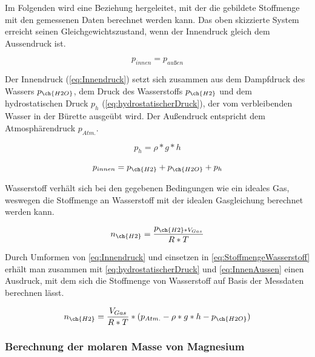 \documentclass{article}
\begin{document}
      Im Folgenden wird eine Beziehung hergeleitet, mit der die gebildete Stoffmenge mit den gemessenen Daten berechnet werden kann. 
      Das oben skizzierte System erreicht seinen Gleichgewichtszustand, wenn der Innendruck gleich dem Aussendruck ist.
    
      \begin{equation}
        p_{innen} = p_{außen} \label{eq:InnenAussen}
      \end{equation}
    
      Der Innendruck (\ref{eq:Innendruck}) setzt sich zusammen aus dem Dampfdruck des Wassers \textit{$ p_{\ch{H2O}}$}, dem Druck des Wasserstoffs \textit{$ p_{\ch{H2}}$} und dem hydrostatischen Druck \textit{$ p_{h}$} (\ref{eq:hydrostatischerDruck}), der vom  verbleibenden Wasser in der Bürette ausgeübt wird. Der Außendruck entspricht dem Atmosphärendruck \textit{$ p_{Atm.}$}.
    
      \begin{equation} 
        p_{h} = \rho * g * h \label{eq:hydrostatischerDruck}
      \end{equation} 
    
      \begin{equation}
        p_{innen} = p_{\ch{H2}} + p_{\ch{H2O}} + p_{h} \label{eq:Innendruck}
      \end{equation}
    
      Wasserstoff verhält sich bei den gegebenen Bedingungen wie ein ideales Gas, weswegen die Stoffmenge an Wasserstoff mit der idealen Gasgleichung berechnet werden kann.
    
      \begin{equation}
        n_{\ch{H2}} = \frac{p_{\ch{H2} * V_{Gas}}}{R*T} \label{eq:StoffmengeWasserstoff}
      \end{equation}     
    
      Durch Umformen von \eqref{eq:Innendruck} und einsetzen in \eqref{eq:StoffmengeWasserstoff} erhält man zusammen mit \eqref{eq:hydrostatischerDruck} und \eqref{eq:InnenAussen} einen Ausdruck, mit dem sich die Stoffmenge von Wasserstoff auf Basis der Messdaten berechnen lässt.
    
    
      \begin{equation}
        n_{\ch{H2}} = \frac{V_{Gas}}{R*T} * (p_{Atm.} - \rho * g * h - p_{\ch{H2O}}) \label{eq:Stoffmenge}
      \end{equation}
    
      \subsubsection{Berechnung der molaren Masse von Magnesium}
    
\end{document}
